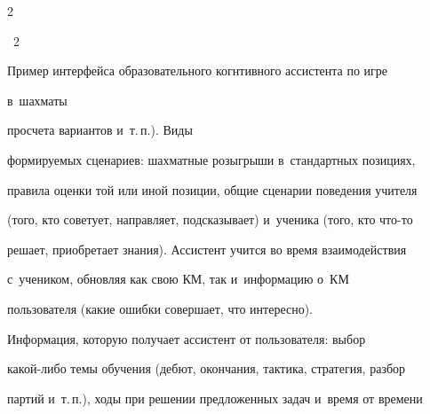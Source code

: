 \begin{multicols}{2}
{\begin{center}
{ \epsfxsize=79mm 




 }








\end{center}













\noindent


{{\figurename~2}\ \ \small{Пример интерфейса образовательного когнтивного ассистента по игре 


в~шахматы}}





}








\vspace*{12pt}








  


  \noindent


   просчета вариантов и~т.\,п.). Виды 


формируемых сценариев: шахматные розыгрыши в~стандартных позициях, 


правила оценки той или иной позиции, общие сценарии поведения учителя 


(того, кто советует, направляет, подсказывает) и~ученика (того, кто что-то 


решает, приобретает знания). Ассистент учится во время взаимодействия 


с~учеником, обновляя как свою КМ, так и~информацию о~КМ 


пользователя (какие ошибки совершает, что интересно).


  


  Информация, которую получает ассистент от пользователя: выбор  


ка\-кой-ли\-бо темы обучения (дебют, окончания, тактика, стратегия, разбор 


партий и~т.\,п.), ходы при решении предложенных задач и~время от времени 



\end{multicols}
